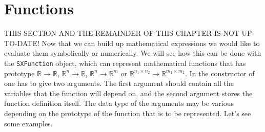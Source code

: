 \documentclass[a4paper,12pt]{book}
\begin{document}
{\section{Functions}
{\color{red}THIS SECTION AND THE REMAINDER OF THIS CHAPTER IS NOT UP-TO-DATE!}
Now that we can build up mathematical expressions we would like to evaluate them symbolically or numerically. We will see how this can be
done with the \texttt{SXFunction} object, which can represent mathematical functions that has prototype
 $\mathbb{R} \rightarrow \mathbb{R}$, $\mathbb{R}^n \rightarrow \mathbb{R}$,
$\mathbb{R}^n \rightarrow \mathbb{R}^m $ or $\mathbb{R}^{n_1 \times n_2} \rightarrow \mathbb{R}^{m_1 \times m_2}$.
In the constructor of \texttt{} one has to give two arguments. The first argument should contain all the variables
that the function will depend on, and the second argument stores the function definition itself. The data type of the arguments may be various
depending on the prototype of the function that is to be represented. Let's see some examples.
}
\end{document}
